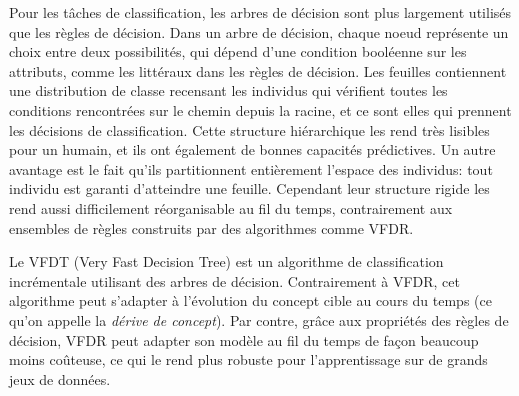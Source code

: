         Pour les tâches de classification, les arbres de décision sont plus largement utilisés que les règles de décision. Dans un arbre de décision, chaque noeud représente un choix entre deux possibilités, qui dépend d'une condition booléenne sur les attributs, comme les littéraux dans les règles de décision. Les feuilles contiennent une distribution de classe recensant les individus qui vérifient toutes les conditions rencontrées sur le chemin depuis la racine, et ce sont elles qui prennent les décisions de classification. Cette structure hiérarchique les rend très lisibles pour un humain, et ils ont également de bonnes capacités prédictives. Un autre avantage est le fait qu'ils partitionnent entièrement l'espace des individus: tout individu est garanti d'atteindre une feuille. Cependant leur structure rigide les rend aussi difficilement réorganisable au fil du temps, contrairement aux ensembles de règles construits par des algorithmes comme VFDR.
        
        Le VFDT (Very Fast Decision Tree) est un algorithme de classification incrémentale utilisant des arbres de décision. Contrairement à VFDR, cet algorithme peut s’adapter à l’évolution du concept cible au cours du temps (ce qu'on appelle la \emph{dérive de concept}). Par contre, grâce aux propriétés des règles de décision, VFDR peut adapter son modèle au fil du temps de façon beaucoup moins coûteuse, ce qui le rend plus robuste pour l'apprentissage sur de grands jeux de données.